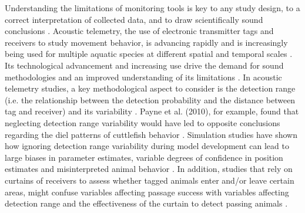 \documentclass[doublespacing,linenumbers]{bmcart}
\begin{document}
Understanding the limitations of monitoring tools is key to any study design, to a correct interpretation of collected data, and to draw scientifically sound conclusions \cite{Bruneel2022SamplingDiversity,Kessel2014}. Acoustic telemetry, the use of electronic transmitter tags and receivers to study movement behavior, is advancing rapidly and is increasingly being used for multiple aquatic species at different spatial and temporal scales \cite{Alos2022TowardTracking,Matley2022GlobalTelemetry,Murray2022AProgramme}. Its technological advancement and increasing use drive the demand for sound methodologies and an improved understanding of its limitations \cite{Gupte2022AData,Kessel2014}. In acoustic telemetry studies, a key methodological aspect to consider is the detection range (i.e. the relationship between the detection probability and the distance between tag and receiver) and its variability \cite{Kessel2014}. Payne et al. (2010), for example, found that neglecting detection range variability would have led to opposite conclusions regarding the diel patterns of cuttlefish behavior \cite{Payne2010InterpretingControls}. Simulation studies have shown how ignoring detection range variability during model development can lead to large biases in parameter estimates, variable degrees of confidence in position estimates and misinterpreted animal behavior \cite{Pedersen2013, Winton2018}. In addition, studies that rely on curtains of receivers to assess whether tagged animals enter and/or leave certain areas, might confuse variables affecting passage success with variables affecting detection range and the effectiveness of the curtain to detect passing animals \cite{Bruneel2020QuantifyingSystems,Steckenreuter2017}.   
\end{document}
